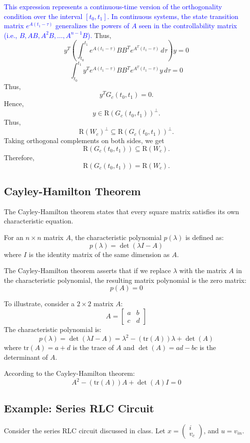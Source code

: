 \documentclass{article}
\begin{document}
\textcolor{blue}{
This expression represents a continuous-time version of the orthogonality condition over the interval $[t_0, t_1]$. 
In continuous systems, the state transition matrix $e^{A(t_1 - \tau)}$ generalizes the powers of $A$ seen in the controllability matrix 
(i.e., $B, AB, A^2B, \ldots, A^{n-1}B$). 
}
Thus,
\[
y^T \left( \int_{t_0}^{t_1} e^{A(t_1 - \tau)} B B^T e^{A^T(t_1 - \tau)} \, d\tau \right) y = 0
\]
\[
\int_{t_0}^{t_1} y^T e^{A(t_1 - \tau)} B B^T e^{A^T(t_1 - \tau)} y \, d\tau = 0
\]
Thus,
\[
y^T G_c(t_0, t_1) = 0.
\]
Hence,
\[
y \in \text{R}(G_c(t_0, t_1))^\perp.
\]
Thus,
\[
\text{R}(W_c)^\perp \subseteq \text{R}(G_c(t_0, t_1))^\perp.
\]
Taking orthogonal complements on both sides, we get
\[
\text{R}(G_c(t_0, t_1)) \subseteq \text{R}(W_c).
\]
Therefore,
\[
\text{R}(G_c(t_0, t_1)) = \text{R}(W_c).
\]

\subsection{Cayley-Hamilton Theorem}
The Cayley-Hamilton theorem states that every square matrix satisfies its own characteristic equation. 

For an $n \times n$ matrix $A$, the characteristic polynomial $p(\lambda)$ is defined as:
\[
p(\lambda) = \det(\lambda I - A)
\]
where $I$ is the identity matrix of the same dimension as $A$.

The Cayley-Hamilton theorem asserts that if we replace $\lambda$ with the matrix $A$ in the characteristic polynomial, the resulting matrix polynomial is the zero matrix:
\[
p(A) = 0
\]

To illustrate, consider a $2 \times 2$ matrix $A$:
\[
A = \begin{bmatrix}
a & b \\
c & d
\end{bmatrix}
\]
The characteristic polynomial is:
\[
p(\lambda) = \det(\lambda I - A) = \lambda^2 - (\text{tr}(A))\lambda + \det(A)
\]
where $\text{tr}(A) = a + d$ is the trace of $A$ and $\det(A) = ad - bc$ is the determinant of $A$.

According to the Cayley-Hamilton theorem:
\[
A^2 - (\text{tr}(A))A + \det(A)I = 0
\]

\subsection{Example: Series RLC Circuit}

Consider the series RLC circuit discussed in class. Let $x = \begin{pmatrix} i \\ v_c \end{pmatrix}$, and $u = v_{in}$.
\end{document}
